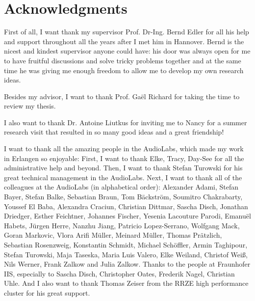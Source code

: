 
\bigskip

\begingroup
\let\clearpage\relax
\let\cleardoublepage\relax
\let\cleardoublepage\relax
\chapter*{Acknowledgments}

First of all, I want thank my supervisor Prof. Dr-Ing. Bernd Edler for all his help and support throughout all the years after I met him in Hannover. Bernd is the nicest and kindest supervisor anyone could have: his door was always open for me to have fruitful discussions and solve tricky problems together and at the same time he was giving me enough freedom to allow me to develop my own research ideas.

\bigskip

Besides my advisor, I want to thank Prof. Gaël Richard for taking the time to review my thesis.

\bigskip
I also want to thank Dr. Antoine Liutkus for inviting me to Nancy for a summer research visit that resulted in so many good ideas and a great friendship!

\bigskip

I want to thank all the amazing people in the AudioLabs, which made my work in Erlangen so enjoyable: First, I want to thank Elke, Tracy, Day-See for all the administrative help and beyond. Then, I want to thank Stefan Turowski for his great technical management in the AudioLabs. Next, I want to thank all of the colleagues at the AudioLabs (in alphabetical order): 
Alexander Adami, Stefan Bayer, Stefan Balke, Sebastian Braun, Tom Bäckström, Soumitro Chakrabarty, Youssef El Baba, Alexandra Craciun, Christian Dittmar, Sascha Disch, Jonathan Driedger, Esther Feichtner, Johannes Fischer, Yesenia Lacouture Parodi, Emanuël Habets, Jürgen Herre, Nanzhu Jiang, Patricio Lopez-Serrano, Wolfgang Mack, Goran Markovic, Vlora Arifi Müller, Meinard Müller, Thomas Prätzlich, Sebastian Rosenzweig, Konstantin Schmidt, Michael Schöffler, Armin Taghipour, Stefan Turowski, Maja Taseska, Maria Luis Valero, Elke Weiland, Christof Weiß, Nils Werner, Frank Zalkow and Julia Zalkow. Thanks to the people at Fraunhofer IIS, especially to Sascha Disch, Christopher Oates, Frederik Nagel, Christian Uhle.
And I also want to thank Thomas Zeiser from the RRZE high performance cluster for his great support.

